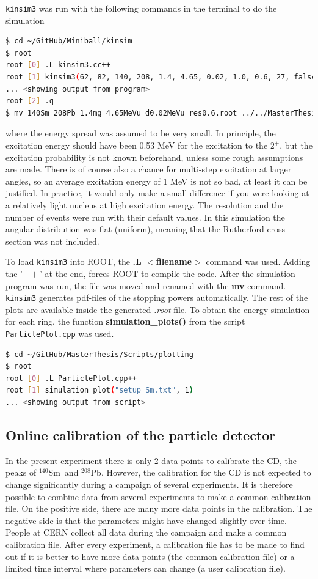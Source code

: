 \documentclass[twoside,english]{uiofysmaster/uiofysmaster}
\newcommand{\Sm}{$^{140}$Sm} %
\newcommand{\Pb}{$^{208}$Pb}
\begin{document}
\texttt{kinsim3} was run with the following commands in the terminal to do the simulation
\begin{lstlisting}[language=sh]
$ cd ~/GitHub/Miniball/kinsim
$ root
root [0] .L kinsim3.cc++
root [1] kinsim3(62, 82, 140, 208, 1.4, 4.65, 0.02, 1.0, 0.6, 27, false, 1e6, "../SRIM")
... <showing output from program>
root [2] .q
$ mv 140Sm_208Pb_1.4mg_4.65MeVu_d0.02MeVu_res0.6.root ../../MasterThesis/Sorted_data/sim_140Sm_208Pb.root
\end{lstlisting}
where the energy spread was assumed to be very small. 
In principle, the excitation energy should have been 0.53 MeV for the excitation to the $2^+$, but the excitation probability is not known beforehand, unless some rough assumptions are made.
There is of course also a chance for multi-step excitation at larger angles, so an average excitation energy of 1 MeV is not so bad, at least it can be justified.
In practice, it would only make a small difference if you were looking at a relatively light nucleus at high excitation energy.
The resolution and the number of events were run with their default values.
In this simulation the angular distribution was flat (uniform), meaning that the Rutherford cross section was not included. 

To load \texttt{kinsim3} into ROOT, the \textbf{.L $<$filename$>$} command was used. Adding the '$++$' at the end, forces ROOT to compile the code. 
After the simulation program was run, the file was moved and renamed with the \textbf{mv} command. 
\texttt{kinsim3} generates pdf-files of the stopping powers automatically. 
The rest of the plots are available inside the generated \textit{.root}-file. 
To obtain the energy simulation for each ring, the function \textbf{simulation\_plots()} from the script \texttt{ParticlePlot.cpp} was used. 
\begin{lstlisting}[language=sh]
$ cd ~/GitHub/MasterThesis/Scripts/plotting
$ root
root [0] .L ParticlePlot.cpp++
root [1] simulation_plot("setup_Sm.txt", 1)
... <showing output from script>
\end{lstlisting}


\subsection{Online calibration of the particle detector}\label{ssec:online_cal}
In the present experiment there is only 2 data points to calibrate the CD, the peaks of \Sm\ and \Pb.
However, the calibration for the CD is not expected to change significantly during a campaign of several experiments. 
It is therefore possible to combine data from several experiments to make a common calibration file.
On the positive side, there are many more data points in the calibration.
The negative side is that the parameters might have changed slightly over time. 
People at CERN collect all data during the campaign and make a common calibration file.
After every experiment, a calibration file has to be made to find out if it is better to have more data points (the common calibration file) or a limited time interval where parameters can change (a user calibration file).
\end{document}
